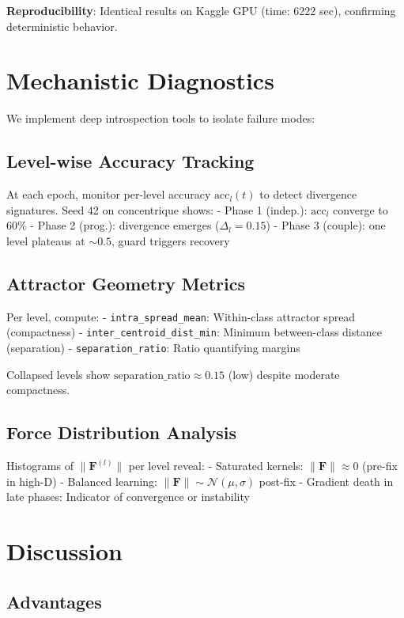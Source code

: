 \documentclass[11pt,a4paper]{article}
\begin{document}
\textbf{Reproducibility}: Identical results on Kaggle GPU (time: 6222 sec), confirming deterministic behavior.

\section{Mechanistic Diagnostics}

We implement deep introspection tools to isolate failure modes:

\subsection{Level-wise Accuracy Tracking}

At each epoch, monitor per-level accuracy $\text{acc}_l(t)$ to detect divergence signatures. Seed 42 on concentrique shows:
- Phase 1 (indep.): $\text{acc}_l$ converge to $60\%$
- Phase 2 (prog.): divergence emerges ($\Delta_l = 0.15$)
- Phase 3 (couple): one level plateaus at $\sim 0.5$, guard triggers recovery

\subsection{Attractor Geometry Metrics}

Per level, compute:
- \texttt{intra\_spread\_mean}: Within-class attractor spread (compactness)
- \texttt{inter\_centroid\_dist\_min}: Minimum between-class distance (separation)
- \texttt{separation\_ratio}: Ratio quantifying margins

Collapsed levels show $\text{separation\_ratio} \approx 0.15$ (low) despite moderate compactness.

\subsection{Force Distribution Analysis}

Histograms of $\|\mathbf{F}^{(l)}\|$ per level reveal:
- Saturated kernels: $\|\mathbf{F}\| \approx 0$ (pre-fix in high-D)
- Balanced learning: $\|\mathbf{F}\| \sim \mathcal{N}(\mu, \sigma)$ post-fix
- Gradient death in late phases: Indicator of convergence or instability

\section{Discussion}

\subsection{Advantages}
\end{document}
